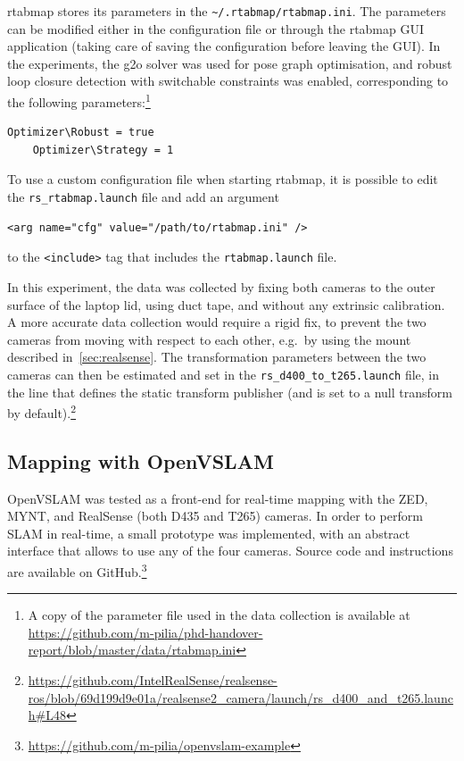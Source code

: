 \documentclass[11pt, letterpaper, twoside]{article}
\begin{document}
\gls{rtabmap} stores its parameters in the
\texttt{\textasciitilde/.rtabmap/rtabmap.ini}. The parameters can be modified
either in the configuration file or through the \gls{rtabmap} GUI application
(taking care of saving the configuration before leaving the GUI). In the
experiments, the g2o solver was used for pose graph optimisation, and robust
loop closure detection with switchable constraints was enabled, corresponding
to the following parameters:\footnote{A copy of the parameter file used in the data
collection is available at
\url{https://github.com/m-pilia/phd-handover-report/blob/master/data/rtabmap.ini}}
\begin{Verbatim}[samepage=true]
    Optimizer\Robust = true
    Optimizer\Strategy = 1
\end{Verbatim}
To use a custom configuration file when starting \gls{rtabmap}, it is possible
to edit the \texttt{rs\_rtabmap.launch} file and add an argument
\begin{Verbatim}[samepage=true]
    <arg name="cfg" value="/path/to/rtabmap.ini" />
\end{Verbatim}
to the \texttt{<include>} tag that includes the \texttt{rtabmap.launch} file.

In this experiment, the data was collected by fixing both cameras to the outer
surface of the laptop lid, using duct tape, and without any extrinsic
calibration. A more accurate data collection would require a rigid fix, to
prevent the two cameras from moving with respect to each other, e.g.\ by using
the mount described in~\cref{sec:realsense}. The transformation parameters
between the two cameras can then be estimated and set in the
\texttt{rs\_d400\_to\_t265.launch} file, in the line that defines the static
transform publisher (and is set to a null transform by
default).\footnote{\url{https://github.com/IntelRealSense/realsense-ros/blob/69d199d9e01a/realsense2_camera/launch/rs_d400_and_t265.launch\#L48}}

\subsection{Mapping with OpenVSLAM}\label{sec:openvslam-setup}

OpenVSLAM was tested as a front-end for real-time mapping with the ZED, MYNT,
and RealSense (both D435 and T265) cameras. In order to perform SLAM in
real-time, a small prototype was implemented, with an abstract interface that
allows to use any of the four cameras. Source code and instructions are
available on
GitHub.\footnote{\url{https://github.com/m-pilia/openvslam-example}}
\end{document}
